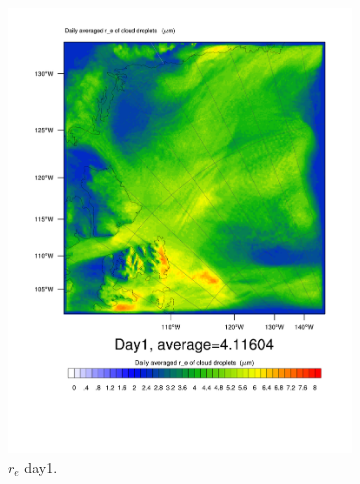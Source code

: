 \begin{figure}
	\begin{subfigure}{0.40\textwidth}
		\centering
		\includegraphics[width=\textwidth]{results/control/RE_CLOUD_Day1.pdf}
		\caption{$r_e$ day1.}
		\label{subfig:recloud_r1Day1}
	\end{subfigure}
	\begin{subfigure}{0.40\textwidth}
		\centering

\end{subfigure}
\end{figure}
